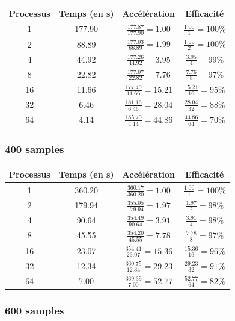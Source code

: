 \documentclass{article}
\begin{document}
\begin{tabular}{ | c | c | c | c |}
  \hline
  Processus & Temps (en s) & Accélération & Efficacité \\
  \hline
  1 & 177.90 & $\frac{177.87}{177.90} = 1.00 $ & $ \frac{1.00}{1} = 100\% $ \\
  2 & 88.89 & $\frac{177.03}{88.89} = 1.99 $ & $ \frac{1.99}{2} = 100\% $ \\
  4 & 44.92 & $\frac{177.26}{44.92} = 3.95 $ & $ \frac{3.95}{4} = 99\% $ \\
  8 & 22.82 & $\frac{177.07}{22.82} = 7.76 $ & $ \frac{7.76}{8} = 97\% $ \\
  16 & 11.66 & $\frac{177.40}{11.66} = 15.21 $ & $ \frac{15.21}{16} = 95\% $ \\
  32 & 6.46 & $\frac{181.16}{6.46} = 28.04 $ & $ \frac{28.04}{32} = 88\% $ \\
  64 & 4.14 & $\frac{185.70}{4.14} = 44.86 $ & $ \frac{44.86}{64} = 70\% $ \\
  \hline
\end{tabular}

\subsubsection{400 samples}

\begin{tabular}{ | c | c | c | c |}
  \hline
  Processus & Temps (en s) & Accélération & Efficacité \\
  \hline
  1 & 360.20 & $\frac{360.17}{360.20} = 1.00 $ & $ \frac{1.00}{1} = 100\% $ \\
  2 & 179.94 & $\frac{355.05}{179.94} = 1.97 $ & $ \frac{1.97}{2} = 98\% $ \\
  4 & 90.64 & $\frac{354.49}{90.64} = 3.91 $ & $ \frac{3.91}{4} = 98\% $ \\
  8 & 45.55 & $\frac{354.20}{45.55} = 7.78 $ & $ \frac{7.78}{8} = 97\% $ \\
  16 & 23.07 & $\frac{354.41}{23.07} = 15.36 $ & $ \frac{15.36}{16} = 96\% $ \\
  32 & 12.34 & $\frac{360.75}{12.34} = 29.23 $ & $ \frac{29.23}{32} = 91\% $ \\
  64 & 7.00 & $\frac{369.39}{7.00} = 52.77 $ & $ \frac{52.77}{64} = 82\% $ \\
  \hline
\end{tabular}

\subsubsection{600 samples}
\end{document}
